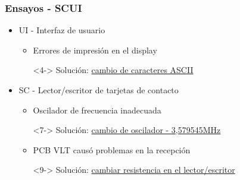 \documentclass{beamer}
\begin{document}
\begin{frame}
	\frametitle{Ensayos - SCUI}
	\begin{itemize}
		\item <2-> UI - Interfaz de usuario
		\begin{itemize}		
			\item <3-> Errores de impresión en el display
			\item[ ] <4-> Solución: \underline{cambio de caracteres ASCII}
	\end{itemize}

	\bigskip	
	\item <5-> SC - Lector/escritor de tarjetas de contacto
		\begin{itemize}
			\item <6-> Oscilador de frecuencia inadecuada
			\item[ ] <7-> Solución: \underline{cambio de oscilador - 3,579545MHz}

			\bigskip
			\item <8-> PCB VLT causó problemas en la recepción
			\item[ ] <9-> Solución: \underline{cambiar resistencia en el lector/escritor}
		\end{itemize}	
	\end{itemize}
\end{frame}
\end{document}
